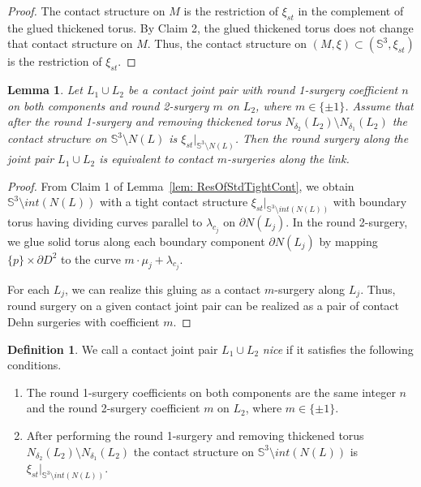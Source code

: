 \documentclass{amsart}
\theoremstyle{plain}
\newtheorem{lem}{Lemma}
\theoremstyle{remark}
\theoremstyle{definition}
\newtheorem{defn}{Definition}
\newcommand{\s}{\mathbb{S}}
\newcommand{\dd}{\partial}
\begin{document}
\begin{proof}
The contact structure on $M$ is the restriction of $\xi_{st}$ in the complement of the glued thickened torus. 
By Claim 2, the glued thickened torus does not change that contact structure on $M$.
Thus, the contact structure on $(M, \xi) \subset \left(\s^3, \xi_{st}\right)$ is the restriction of $\xi_{st}$. 
\end{proof}

\begin{lem}\label{lem: RealOfContJointPairAsContDehnSur}
   Let $L_{1}\cup L_{2}$ be a contact joint pair with round 1-surgery coefficient $n$ on both components and round 2-surgery $m$ on $L_{2}$, where $m\in \{\pm1\}$. 
    Assume that after the round 1-surgery and removing thickened torus $N_{\delta_2}(L_{2})\setminus N_{\delta_1}(L_{2})$ the contact structure on $\s^3 \setminus N(L)$ is $\xi_{st}|_{\s^3 \setminus N(L)}$. 
   Then the round surgery along the joint pair $L_{1}\cup L_{2}$ is equivalent to contact $m$-surgeries along the link.
\end{lem}

\begin{proof}
From Claim 1 of Lemma~\ref{lem: ResOfStdTightCont}, we obtain $\s^3 \setminus int (N(L))$ with a tight contact structure $\xi_{st}|_{\s^3 \setminus int(N(L))}$ with boundary torus having dividing curves parallel to $\lambda_{c_j}$ on $\dd N(L_{j})$. 
In the round 2-surgery, we glue solid torus along each boundary component $\dd N(L_{j})$ by mapping $\{p\} \times \dd D^2$ to the curve $m\cdot \mu_j + \lambda_{c_j} $. 

For each $L_{j}$, we can realize this gluing as a contact $ m$-surgery along $L_j$. 
Thus, round surgery on a given contact joint pair can be realized as a pair of contact Dehn surgeries with coefficient $m$.
\end{proof}

\begin{defn}
    We call a contact joint pair $L_{1}\cup L_{2}$ {\it nice} if it satisfies the following conditions. 
   \begin{enumerate}
       \item The round 1-surgery coefficients on both components are the same integer $n$ and the round 2-surgery coefficient $m$ on $L_{2}$, where $m\in \{\pm1\}$.
       \item After performing the round 1-surgery and removing thickened torus $N_{\delta_2}(L_{2})\setminus N_{\delta_1}(L_{2})$ the contact structure on $\s^3 \setminus int(N(L))$ is $\xi_{st}|_{\s^3 \setminus int(N(L))}$.
   \end{enumerate}
\end{defn}
\end{document}
